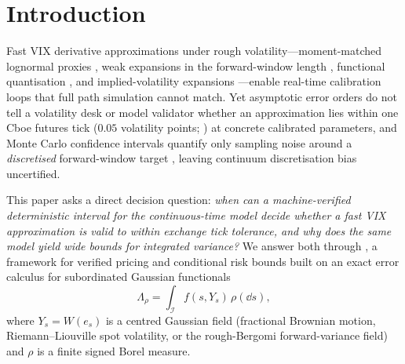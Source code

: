 \section{Introduction}\label{sec:intro}

Fast VIX derivative approximations under rough volatility---moment-matched lognormal proxies
\citep{BayerFrizGatheral2016,JacquierMartiniMuguruza2018}, weak expansions in the forward-window length
\citep{BourgeyDeMarcoGobet2023}, functional quantisation \citep{BonesiniCallegaroJacquier2023}, and
implied-volatility expansions \citep{LiaoAgarwalBourgey2026}---enable real-time calibration loops that
full path simulation cannot match. Yet asymptotic error orders do not tell a volatility desk or model
validator whether an approximation lies within one Cboe futures tick ($0.05$ volatility points;
\citealp{CBOE2024VIX}) at concrete calibrated parameters, and Monte Carlo confidence intervals quantify
only sampling noise around a \emph{discretised} forward-window target \citep{BourgeyDeMarco2022},
leaving continuum discretisation bias uncertified.

This paper asks a direct decision question: \emph{when can a machine-verified deterministic interval for
the continuous-time model decide whether a fast VIX approximation is valid to within exchange tick
tolerance, and why does the same model yield wide bounds for integrated variance?} We answer both through
\RoughCert{}, a framework for verified pricing and conditional risk bounds built on an exact error calculus for
subordinated Gaussian functionals
\[
  \Lambda_\rho=\int_{\mathcal{I}} f(s,Y_s)\,\rho(\dd s),
\]
where $Y_s=W(e_s)$ is a centred Gaussian field (fractional Brownian motion, Riemann--Liouville spot
volatility, or the rough-Bergomi forward-variance field) and $\rho$ is a finite signed Borel measure.

